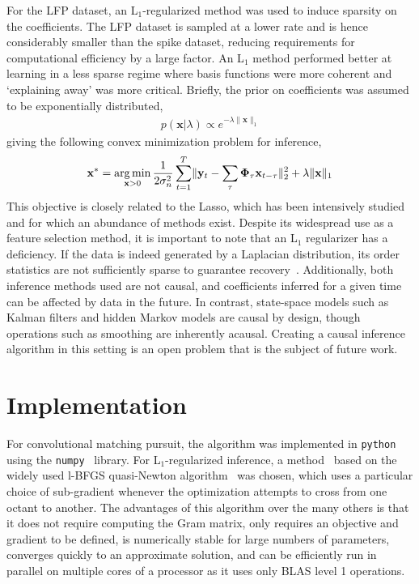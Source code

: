 \documentclass[10pt]{article}
\newcommand{\mb}{\mathbf}
\newcommand{\norm}[1]{\lVert#1\rVert}
\newcommand\argmin{\operatornamewithlimits{arg\,min}}
\begin{document}
For the LFP dataset, an L$_1$-regularized method was used to induce
sparsity on the coefficients. The LFP dataset is sampled at a lower
rate and is hence considerably smaller than the spike dataset,
reducing requirements for computational efficiency by a large
factor. An L$_1$ method performed better at learning in a less sparse
regime where basis functions were more coherent and `explaining away'
was more critical. Briefly, the prior on coefficients was assumed to be
exponentially distributed,
\begin{align*}
  p(\mb{x}|\lambda) \propto e^{-\lambda \norm{\mb{x}}_1}
\end{align*}
giving the following convex minimization problem for inference,
\begin{align*}
  \mb{x}^* = \argmin_{\mb{x}>0} \frac{1}{2 \sigma_n^2} \sum_{t=1}^T
  \norm{\mb{y}_t - \sum_\tau \mb{\Phi}_\tau \mb{x}_{t-\tau}}^2_2 +
  \lambda\norm{\mb{x}}_1
\end{align*}
This objective is closely related to the Lasso, which has been
intensively studied~\cite{tibshirani1996regression,chen1999atomic} and
for which an abundance of methods exist. Despite its widespread use as
a feature selection method, it is important to note that an L$_1$
regularizer has a deficiency. If the data is indeed generated by a
Laplacian distribution, its order statistics are not sufficiently
sparse to guarantee recovery~\cite{baraniuk2010low}. Additionally,
both inference methods used are not causal, and coefficients inferred
for a given time can be affected by data in the future. In contrast,
state-space models such as Kalman filters and hidden Markov models are
causal by design, though operations such as smoothing are inherently
acausal. Creating a causal inference algorithm in this setting is an
open problem that is the subject of future work.

\section{Implementation}

For convolutional matching pursuit, the algorithm was implemented in
\texttt{python} using the \texttt{numpy}~\cite{numpyscipy}
library. For L$_1$-regularized inference, a
method~\cite{andrew2007scalable} based on the widely used l-BFGS
quasi-Newton algorithm~\cite{Liu89} was chosen, which uses a
particular choice of sub-gradient whenever the optimization attempts
to cross from one octant to another. The advantages of this algorithm
over the many others is that it does not require computing the Gram
matrix, only requires an objective and gradient to be defined, is
numerically stable for large numbers of parameters, converges quickly
to an approximate solution, and can be efficiently run in parallel on
multiple cores of a processor as it uses only BLAS level 1 operations.
\end{document}
